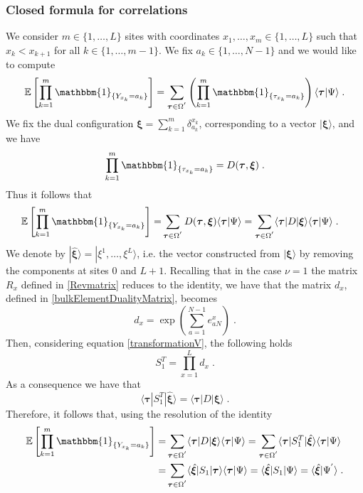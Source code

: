 \documentclass[10pt]{article}
\numberwithin{equation}{section}
\numberwithin{equation}{subsection}
\newcommand{\dt}{\;.}
\begin{document}
\subsubsection{Closed formula for correlations}\label{correlation-section}
We consider $m\in \{1,\ldots,L\}$ sites with coordinates $x_{1},\ldots,x_{m}\in \{1,\ldots,L\}$ such that $x_{k}<x_{k+1}$ for all $k\in \{1,\ldots,m-1\}$. We fix $a_{k}\in\{1,\ldots,N-1\}$ and we would like to compute
\begin{equation}
	\mathbb{E}\left[\prod_{k=1}^{m}\mathbbm{1}_{\{Y_{x_{k}}=a_{k}\}}\right]=\sum_{\bm{\tau}\in \Omega^{'}}\left(\prod_{k=1}^{m}\mathbbm{1}_{\{\tau_{x_{k}}=a_{k}\}}\right)\langle\bm{\tau}|\Psi\rangle\dt
\end{equation}
We fix the dual configuration $\bm{\xi}=\sum_{k=1}^{m}\delta_{a_{k}}^{x_{k}}$, corresponding to a vector $|\bm{\xi}\rangle$, and we have 
\begin{equation}
	\prod_{k=1}^{m}\mathbbm{1}_{\{\tau_{x_{k}}=a_{k}\}}=D(\bm{\tau},\bm{\xi})\dt
\end{equation}
Thus it follows that 
\begin{align}
	\mathbb{E}\left[\prod_{k=1}^{m}\mathbbm{1}_{\{Y_{x_{k}}=a_{k}\}}\right]=&\sum_{\bm{\tau}\in \Omega^{'}}D(\bm{\tau},\bm{\xi})\langle\bm{\tau}|\Psi\rangle
	=\sum_{\bm{\tau}\in \Omega^{'}}\langle \bm{\tau}|D|\bm{\xi}\rangle\langle\bm{\tau}|\Psi\rangle\dt
\end{align}
We denote by $|\hat{\bm{\xi}}\rangle=|\xi^{1},\ldots,\xi^{L}\rangle$, i.e. the vector constructed from $|\bm{\xi}\rangle$ by removing the components at sites $0$ and $L+1$. Recalling that {in the case $\nu=1$ the matrix $R_{x}$ defined in \eqref{Revmatrix} reduces to the identity, we have that the matrix $d_{x}$, defined in \eqref{bulkElementDualityMatrix}, becomes
\begin{equation}
	d_{x}=\exp{(\sum_{a=1}^{N-1}e_{aN}^{x})}\dt
	\end{equation} Then, considering equation \eqref{transformationV}, the following holds}
\begin{equation}
	S_{1}^{T}=\prod_{x=1}^{L}d_{x}\dt
\end{equation}  
{As a consequence we have that }
\begin{equation}
	\langle \bm{\tau}|S_{1}^{T}|\hat{\bm{\xi}}\rangle=\langle \bm{\tau}|D|\bm{\xi}\rangle \dt
\end{equation}
Therefore, it follows that, using the resolution of the identity
\begin{align}
\label{corr-psi1}
	\mathbb{E}\left[\prod_{k=1}^{m}\mathbbm{1}_{\{Y_{x_{k}}=a_{k}\}}\right]=& \sum_{\bm{\tau}\in \Omega^{'}}\langle \bm{\tau}|D|\bm{\xi}\rangle\langle\bm{\tau}|\Psi\rangle
	=\sum_{\bm{\tau}\in \Omega^{'}}\langle \bm{\tau}|S_{1}^{T}|\hat{\bm{\xi}}\rangle\langle\bm{\tau}|\Psi\rangle\nonumber\\
	=&\sum_{\bm{\tau}\in \Omega^{'}}\langle \hat{\bm{\xi}}|S_{1}|\bm{\tau}\rangle\langle\bm{\tau}|\Psi\rangle
	=\langle \hat{\bm{\xi}}|S_{1}|\Psi\rangle
	=\langle \hat{\bm{\xi}}|\Psi^{'}\rangle\dt
\end{align}
\end{document}
